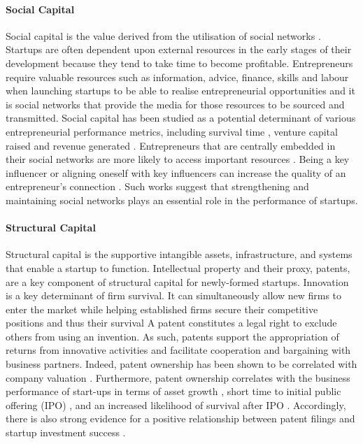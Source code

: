 \documentclass[../thesis/thesis.tex]{subfiles}
\begin{document}
\paragraph{Social Capital}

Social capital is the value derived from the utilisation of social networks \cite{gedajlovic2013}. Startups are often dependent upon external resources in the early stages of their development because they tend to take time to become profitable. Entrepreneurs require valuable resources such as information, advice, finance, skills and labour when launching startups to be able to realise entrepreneurial opportunities \cite{greve2003} and it is social networks that provide the media for those resources to be sourced and transmitted. Social capital has been studied as a potential determinant of various entrepreneurial performance metrics, including survival time \cite{raz2007, song2012}, venture capital raised \cite{gloor2013} and revenue generated \cite{stam2008, formsma2012}. Entrepreneurs that are centrally embedded in their social networks are more likely to access important resources \cite{raz2007, song2012}. Being a key influencer or aligning oneself with key influencers can increase the quality of an entrepreneur's connection \cite{gloor2013}. Such works suggest that strengthening and maintaining social networks plays an essential role in the performance of startups.

\paragraph{Structural Capital}

Structural capital is the supportive intangible assets, infrastructure, and systems that enable a startup to function. Intellectual property and their proxy, patents, are a key component of structural capital for newly-formed startups. Innovation is a key determinant of firm survival. It can simultaneously allow new firms to enter the market while helping established firms secure their competitive positions and thus their survival A patent constitutes a legal right to exclude others from using an invention. As such, patents support the appropriation of returns from innovative activities and facilitate cooperation and bargaining with business partners. Indeed, patent ownership has been shown to be correlated with company valuation \cite{CITE}. Furthermore, patent ownership correlates with the business performance of start-ups in terms of asset growth \cite{helmers2011}, short time to initial public offering (IPO) \cite{stuart1999}, and an increased likelihood of survival after IPO \cite{wagner2010}. Accordingly, there is also strong evidence for a positive relationship between patent filings and startup investment success \cite{hoenig2014}.
\end{document}
